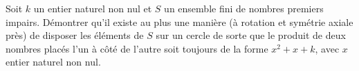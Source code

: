 Soit $k$ un entier naturel non nul et $S$ un ensemble fini de nombres premiers impairs. Démontrer qu'il
existe au plus une manière (à rotation et symétrie axiale près) de disposer les éléments de $S$ sur un
cercle de sorte que le produit de deux nombres placés l'un à côté de l'autre soit toujours de la forme
$x^2 + x + k$, avec $x$ entier naturel non nul.
